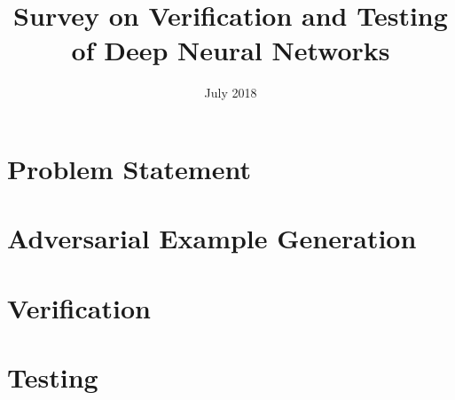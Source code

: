 \documentclass{article}
\title{Survey on Verification and Testing of Deep Neural Networks}
\author{}
\date{July 2018}
\begin{document}
\maketitle

\section{Problem Statement}

\section{Adversarial Example Generation}

\section{Verification} 

\section{Testing} 



\end{document}
